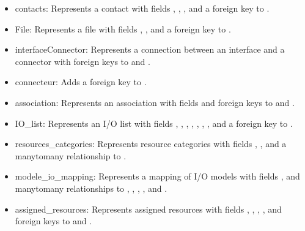 \documentclass[letterpaper,10pt,english]{sphinxmanual}
\begin{document}
\begin{fulllineitems}
\begin{description}
\begin{itemize}
\item {} 
\sphinxAtStartPar
contacts: Represents a contact with fields , , , and a foreign key to .

\item {} 
\sphinxAtStartPar
File: Represents a file with fields , , and a foreign key to .

\item {} 
\sphinxAtStartPar
interfaceConnector: Represents a connection between an interface and a connector with foreign keys to  and .

\item {} 
\sphinxAtStartPar
connecteur: Adds a foreign key to .

\item {} 
\sphinxAtStartPar
association: Represents an association with fields  and foreign keys to  and .

\item {} 
\sphinxAtStartPar
IO\_list: Represents an I/O list with fields , , , , , , , and a foreign key to .

\item {} 
\sphinxAtStartPar
resources\_categories: Represents resource categories with fields , , and a many\sphinxhyphen{}to\sphinxhyphen{}many relationship to .

\item {} 
\sphinxAtStartPar
modele\_io\_mapping: Represents a mapping of I/O models with fields , and many\sphinxhyphen{}to\sphinxhyphen{}many relationships to , , , , and .

\item {} 
\sphinxAtStartPar
assigned\_resources: Represents assigned resources with fields , , , , and foreign keys to  and .


\end{itemize}
\end{description}
\end{fulllineitems}
\end{document}
